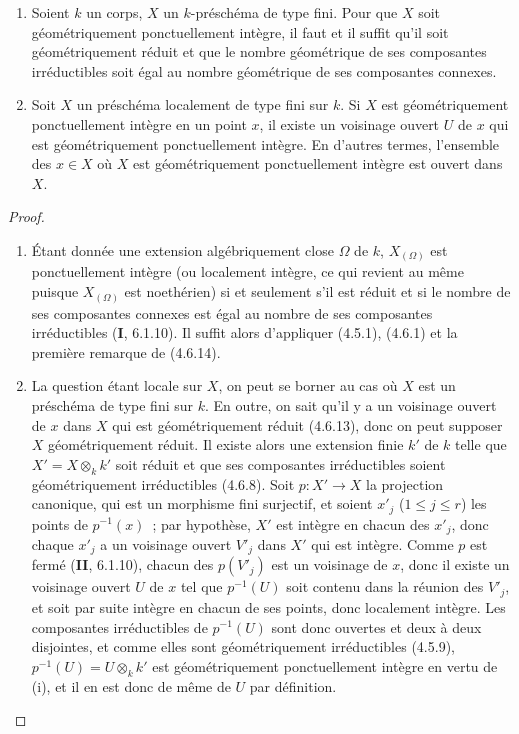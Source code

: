 \begin{proposition}[4.6.15]
\label{IV.2.4.6.15-fr}
\begin{enumerate}
\item[\textup{(i)}] Soient $k$ un corps, $X$ un $k$-préschéma de type fini. Pour que $X$
soit géométriquement ponctuellement intègre, il faut et il suffit qu'il soit
géométriquement réduit et que le nombre géométrique de ses composantes
irréductibles soit égal au nombre géométrique de ses composantes connexes.
\item[\textup{(ii)}] Soit $X$ un préschéma localement de type fini sur $k$. Si $X$ est
géométriquement ponctuellement intègre en un point $x$, il existe un voisinage
ouvert $U$ de $x$ qui est géométriquement ponctuellement intègre. En d'autres
termes, l'ensemble des $x\in X$ où $X$ est géométriquement ponctuellement
intègre est ouvert dans $X$.
\end{enumerate}
\end{proposition}

\begin{proof}
\begin{enumerate}
\item[(i)] Étant donnée une extension algébriquement close $\Omega$ de $k$,
$X_{(\Omega)}$ est ponctuellement intègre (ou localement intègre, ce qui
revient au même puisque $X_{(\Omega)}$ est noethérien) si et seulement s'il est
réduit et si le nombre de ses composantes connexes est égal au nombre de ses
composantes irréductibles (\textbf{I}, 6.1.10). Il suffit alors d'appliquer (4.5.1),
(4.6.1) et la première remarque de (4.6.14).

\item[(ii)] La question étant locale sur $X$, on peut se borner au cas où $X$
est un préschéma de type fini sur $k$. En outre, on sait qu'il y a un voisinage
ouvert de $x$ dans $X$ qui est géométriquement réduit (4.6.13), donc on peut
supposer $X$ géométriquement réduit. Il existe alors une extension finie $k'$
de $k$ telle que $X'=X\otimes_k k'$ soit réduit et que ses composantes
irréductibles soient géométriquement irréductibles (4.6.8). Soit
$p:X'\to X$ la projection canonique, qui est un morphisme fini surjectif, et
soient $x'_j$ ($1\leqslant j\leqslant r$) les points de $p^{-1}(x)$~; par
hypothèse, $X'$ est intègre en chacun des $x'_j$, donc chaque $x'_j$ a un
voisinage ouvert $V'_j$ dans $X'$ qui est intègre. Comme $p$ est fermé
(\textbf{II}, 6.1.10), chacun des $p(V'_j)$ est un voisinage de $x$, donc il existe un
voisinage ouvert $U$ de $x$ tel que $p^{-1}(U)$ soit contenu dans la réunion
des $V'_j$, et soit par suite intègre en chacun de ses points, donc localement
intègre. Les composantes irréductibles de $p^{-1}(U)$ sont donc ouvertes et
deux à deux disjointes, et comme elles sont géométriquement irréductibles
(4.5.9), $p^{-1}(U)=U\otimes_k k'$ est géométriquement ponctuellement intègre
en vertu de (i), et il en est donc de même de $U$ par définition.
\end{enumerate}
\end{proof}

